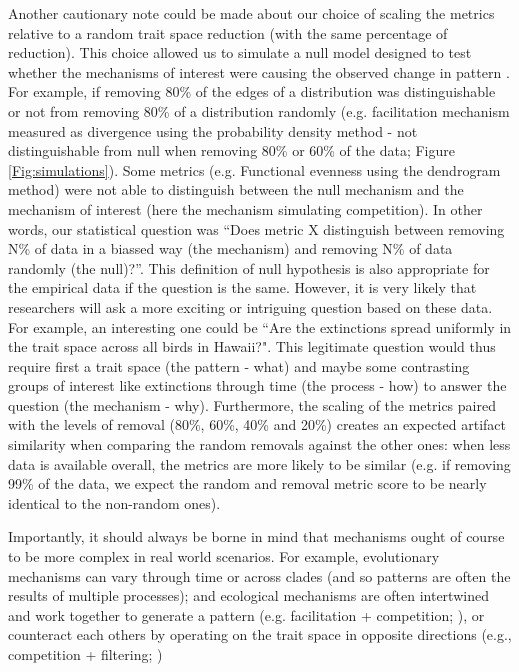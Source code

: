 \documentclass[12pt,letterpaper]{article}
\begin{document}
Another cautionary note could be made about our choice of scaling the metrics relative to a random trait space reduction (with the same percentage of reduction).
This choice allowed us to simulate a null model designed to test whether the mechanisms of interest were causing the observed change in pattern \citep{bausman2018modeling}.
For example, if removing 80\% of the edges of a distribution was distinguishable or not from removing 80\% of a distribution randomly (e.g. facilitation mechanism measured as divergence using the probability density method - not distinguishable from null when removing 80\% or 60\% of the data; Figure \ref{Fig:simulations}).
Some metrics (e.g. Functional evenness using the dendrogram method) were not able to distinguish between the null mechanism and the mechanism of interest (here the mechanism simulating competition).
In other words, our statistical question was ``Does metric X distinguish between removing N\% of data in a biassed way (the mechanism) and removing N\% of data randomly (the null)?''.
This definition of null hypothesis is also appropriate for the empirical data if the question is the same.
However, it is very likely that researchers will ask a more exciting or intriguing question based on these data.
For example, an interesting one could be ``Are the extinctions spread uniformly in the trait space across all birds in Hawaii?".
This legitimate question would thus require first a trait space (the pattern - what) and maybe some contrasting groups of interest like extinctions through time (the process - how) to answer the question (the mechanism - why).
Furthermore, the scaling of the metrics paired with the levels of removal (80\%, 60\%, 40\% and 20\%) creates an expected artifact similarity when comparing the random removals against the other ones: when less data is available overall, the metrics are more likely to be similar (e.g. if removing 99\% of the data, we expect the random and removal metric score to be nearly identical to the non-random ones).

Importantly, it should always be borne in mind that mechanisms ought of course to be more complex in real world scenarios.
For example, evolutionary mechanisms can vary through time or across clades (and so patterns are often the results of multiple processes); and ecological mechanisms are often intertwined and work together to generate a pattern (e.g. facilitation + competition; \citealt{danet2024species}), or counteract each others by operating on the trait space in opposite directions (e.g., competition + filtering; \citealt{mammola2024functional})
\end{document}
